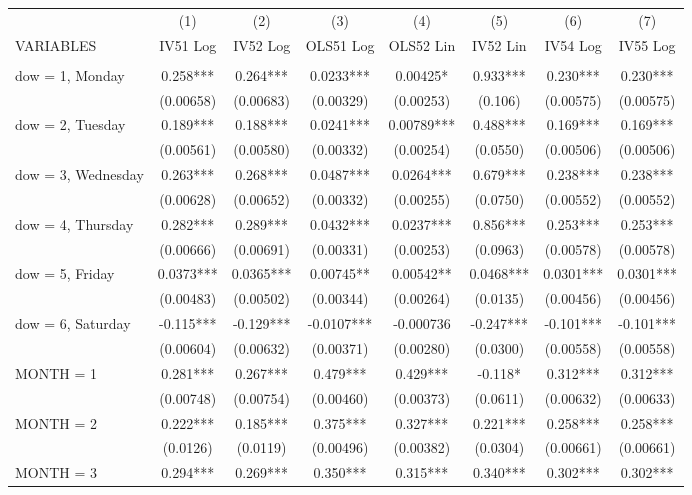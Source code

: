 \begin{tabular}{lccccccc} \hline
 & (1) & (2) & (3) & (4) & (5) & (6) & (7) \\
VARIABLES & IV51 Log & IV52 Log & OLS51 Log & OLS52 Lin & IV52 Lin & IV54 Log & IV55 Log \\ \hline
 &  &  &  &  &  &  &  \\
dow = 1, Monday & 0.258*** & 0.264*** & 0.0233*** & 0.00425* & 0.933*** & 0.230*** & 0.230*** \\
 & (0.00658) & (0.00683) & (0.00329) & (0.00253) & (0.106) & (0.00575) & (0.00575) \\
dow = 2, Tuesday & 0.189*** & 0.188*** & 0.0241*** & 0.00789*** & 0.488*** & 0.169*** & 0.169*** \\
 & (0.00561) & (0.00580) & (0.00332) & (0.00254) & (0.0550) & (0.00506) & (0.00506) \\
dow = 3, Wednesday & 0.263*** & 0.268*** & 0.0487*** & 0.0264*** & 0.679*** & 0.238*** & 0.238*** \\
 & (0.00628) & (0.00652) & (0.00332) & (0.00255) & (0.0750) & (0.00552) & (0.00552) \\
dow = 4, Thursday & 0.282*** & 0.289*** & 0.0432*** & 0.0237*** & 0.856*** & 0.253*** & 0.253*** \\
 & (0.00666) & (0.00691) & (0.00331) & (0.00253) & (0.0963) & (0.00578) & (0.00578) \\
dow = 5, Friday & 0.0373*** & 0.0365*** & 0.00745** & 0.00542** & 0.0468*** & 0.0301*** & 0.0301*** \\
 & (0.00483) & (0.00502) & (0.00344) & (0.00264) & (0.0135) & (0.00456) & (0.00456) \\
dow = 6, Saturday & -0.115*** & -0.129*** & -0.0107*** & -0.000736 & -0.247*** & -0.101*** & -0.101*** \\
 & (0.00604) & (0.00632) & (0.00371) & (0.00280) & (0.0300) & (0.00558) & (0.00558) \\
MONTH = 1 & 0.281*** & 0.267*** & 0.479*** & 0.429*** & -0.118* & 0.312*** & 0.312*** \\
 & (0.00748) & (0.00754) & (0.00460) & (0.00373) & (0.0611) & (0.00632) & (0.00633) \\
MONTH = 2 & 0.222*** & 0.185*** & 0.375*** & 0.327*** & 0.221*** & 0.258*** & 0.258*** \\
 & (0.0126) & (0.0119) & (0.00496) & (0.00382) & (0.0304) & (0.00661) & (0.00661) \\
MONTH = 3 & 0.294*** & 0.269*** & 0.350*** & 0.315*** & 0.340*** & 0.302*** & 0.302*** \\

\end{tabular}
